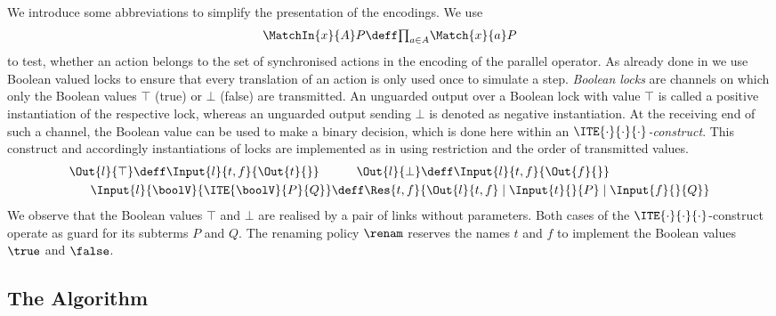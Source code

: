 \documentclass[]{eptcs}
\begin{document}
We introduce some abbreviations to simplify the presentation of the encodings. We use
\begin{align*}
	\MatchIn{x}{A}P \deff \textstyle{\prod_{a \in A}} \Match{x}{a}P
\end{align*}
to test, whether an action belongs to the set of synchronised actions in the encoding of the parallel operator.
As already done in \cite{nestmann96, nestmannPierce00} we use Boolean valued locks to ensure that every translation of an action is only used once to simulate a step.
\emph{Boolean locks} are channels on which only the Boolean values $ \top $ (true) or $ \bot $ (false) are transmitted. An unguarded output over a Boolean lock with value $ \top $ is called a positive instantiation of the respective lock, whereas an unguarded output sending $ \bot $ is denoted as negative instantiation. At the receiving end of such a channel, the Boolean value can be used to make a binary decision, which is done here within an \emph{$ \ITE{\cdot}{\cdot}{\cdot} $-construct}.
This construct and accordingly instantiations of locks are implemented as in \cite{nestmann96, nestmannPierce00} using restriction and the order of transmitted values.
\begin{align*}
	\Out{l}{\top} \deff \Input{l}{t, f}{\Out{t}{}} \quad & \quad\quad \Out{l}{\bot} \deff \Input{l}{t, f}{\Out{f}{}}\\
	\Input{l}{\boolV}{\ITE{\boolV}{P}{Q}} & \deff \Res{t, f}{\Out{l}{t, f} \mid \Input{t}{}{P} \mid \Input{f}{}{Q}}
\end{align*}
We observe that the Boolean values $ \top $ and $ \bot $ are realised by a pair of links without parameters. Both cases of the $ \ITE{\cdot}{\cdot}{\cdot} $-construct operate as guard for its subterms $ P $ and $ Q $. The renaming policy $ \renam $ reserves the names $ t $ and $ f $ to implement the Boolean values $ \true $ and $ \false $.

\subsection{The Algorithm}
\end{document}
